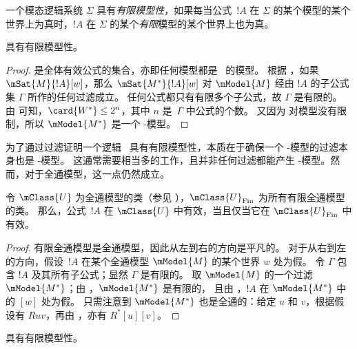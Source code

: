 \documentclass[../../../include/open-logic-section]{subfiles}
\begin{document}


\begin{defn}
  一个模态逻辑系统 $\Sigma$ 具有\emph{有限模型性}，如果每当公式~$!A$ 在 $\Sigma$ 的某个模型的某个世界上为真时，$!A$ 在 $\Sigma$ 的某个\emph{有限}模型的某个世界上也为真。
\end{defn}

\begin{prop}
   具有有限模型性。
\end{prop}

\begin{proof}
   是全体有效公式的集合，亦即任何模型都是~ 的模型。
  根据 ，如果
  $\mSat{M}{!A}[w]$，那么 $\mSat{M^*}{!A}[w]$ 对 $\mModel{M}$ 经由 $!A$ 的子公式集 $\Gamma$ 所作的任何过滤成立。
  任何公式都只有有限多个子公式，故 $\Gamma$ 是有限的。
  由  可知，$\card{W^*} \le 2^n$，其中 $n$ 是~$\Gamma$ 中公式的个数。
  又因为  对模型没有限制，所以 $\mModel{M^*}$ 是一个 -模型。
\end{proof}

为了通过过滤证明一个逻辑~ 具有有限模型性，本质在于确保一个 -模型的过滤本身也是 -模型。
这通常需要相当多的工作，且并非任何过滤都能产生 -模型。然而，对于全通模型，这一点仍然成立。

\begin{prop}
  令 $\mClass{U}$ 为全通模型的类（参见 ），$\mClass{U}_{\mathrm{Fin}}$ 为所有有限全通模型的类。
  那么，公式~$!A$ 在 $\mClass{U}$ 中有效，当且仅当它在 $\mClass{U}_{\mathrm{Fin}}$ 中有效。
\end{prop}

\begin{proof}
  有限全通模型是全通模型，因此从左到右的方向是平凡的。
  对于从右到左的方向，假设~$!A$ 在某个全通模型 $\mModel{M}$ 的某个世界 $w$ 处为假。
  令 $\Gamma$ 包含 $!A$ 及其所有子公式；显然 $\Gamma$ 是有限的。
  取 $\mModel{M}$ 的一个过滤 $\mModel{M^*}$；由 ，$\mModel{M^*}$ 是有限的，
  且由 ，$!A$ 在 $\mModel{M^*}$ 中的 $[w]$ 处为假。
  只需注意到 $\mModel{M^*}$ 也是全通的：给定 $u$ 和 $v$，根据假设有 $Ruv$，再由 ，亦有 $R^*[u][v]$。
\end{proof}

\begin{cor}
   具有有限模型性。
\end{cor}
\end{document}
